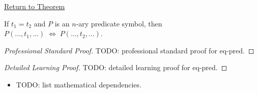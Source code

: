 \newpage
{}
\label{prf:eq-pred}

\begin{remark*}[Return]
\hyperref[thm:eq-pred]{Return to Theorem}
\end{remark*}

\begin{theorem*}
If $t_1 = t_2$ and $P$ is an $n$-ary predicate symbol, then
$P(\dots,t_1,\dots) \;\Leftrightarrow\; P(\dots,t_2,\dots)$.
\end{theorem*}

\begin{proof}[Professional Standard Proof]
\LRAProofBodyStart
TODO: professional standard proof for eq-pred.
\end{proof}

\begin{proof}[Detailed Learning Proof]
\LRAProofBodyStart
TODO: detailed learning proof for eq-pred.
\end{proof}

\begin{remark*}
\end{remark*}

\begin{dependencies}
\begin{itemize}
  \item TODO: list mathematical dependencies.
\end{itemize}
\end{dependencies}

\clearpage

